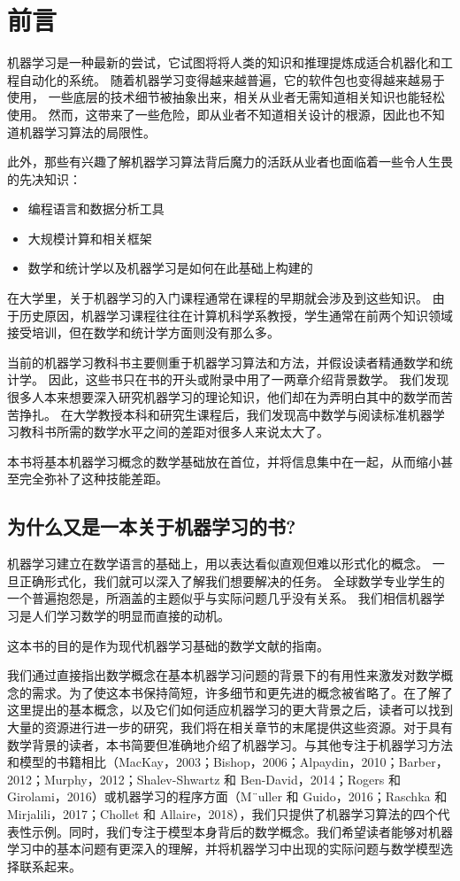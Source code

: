 \chapter*{前言}

机器学习是一种最新的尝试，它试图将将人类的知识和推理提炼成适合机器化和工程自动化的系统。 随着机器学习变得越来越普遍，它的软件包也变得越来越易于使用， 一些底层的技术细节被抽象出来，相关从业者无需知道相关知识也能轻松使用。 然而，这带来了一些危险，即从业者不知道相关设计的根源，因此也不知道机器学习算法的局限性。

此外，那些有兴趣了解机器学习算法背后魔力的活跃从业者也面临着一些令人生畏的先决知识：

\begin{itemize}
\item 编程语言和数据分析工具
\item 大规模计算和相关框架
\item 数学和统计学以及机器学习是如何在此基础上构建的
\end{itemize}

在大学里，关于机器学习的入门课程通常在课程的早期就会涉及到这些知识。 由于历史原因，机器学习课程往往在计算机科学系教授，学生通常在前两个知识领域接受培训，但在数学和统计学方面则没有那么多。

当前的机器学习教科书主要侧重于机器学习算法和方法，并假设读者精通数学和统计学。 因此，这些书只在书的开头或附录中用了一两章介绍背景数学。 我们发现很多人本来想要深入研究机器学习的理论知识，他们却在为弄明白其中的数学而苦苦挣扎。 在大学教授本科和研究生课程后，我们发现高中数学与阅读标准机器学习教科书所需的数学水平之间的差距对很多人来说太大了。

本书将基本机器学习概念的数学基础放在首位，并将信息集中在一起，从而缩小甚至完全弥补了这种技能差距。

\section*{为什么又是一本关于机器学习的书?}

机器学习建立在数学语言的基础上，用以表达看似直观但难以形式化的概念。 一旦正确形式化，我们就可以深入了解我们想要解决的任务。 全球数学专业学生的一个普遍抱怨是，所涵盖的主题似乎与实际问题几乎没有关系。 我们相信机器学习是人们学习数学的明显而直接的动机。

这本书的目的是作为现代机器学习基础的数学文献的指南。

我们通过直接指出数学概念在基本机器学习问题的背景下的有用性来激发对数学概念的需求。为了使这本书保持简短，许多细节和更先进的概念被省略了。在了解了这里提出的基本概念，以及它们如何适应机器学习的更大背景之后，读者可以找到大量的资源进行进一步的研究，我们将在相关章节的末尾提供这些资源。对于具有数学背景的读者，本书简要但准确地介绍了机器学习。与其他专注于机器学习方法和模型的书籍相比（MacKay，2003；Bishop，2006；Alpaydin，2010；Barber，2012；Murphy，2012；Shalev-Shwartz 和 Ben-David，2014；Rogers 和 Girolami，2016）或机器学习的程序方面（M¨uller 和 Guido，2016；Raschka 和 Mirjalili，2017；Chollet 和 Allaire，2018），我们只提供了机器学习算法的四个代表性示例。同时，我们专注于模型本身背后的数学概念。我们希望读者能够对机器学习中的基本问题有更深入的理解，并将机器学习中出现的实际问题与数学模型选择联系起来。

